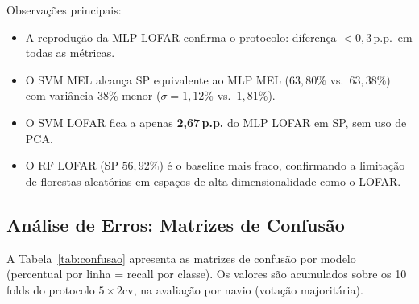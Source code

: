 \documentclass[a4paper,12pt]{article}
\begin{document}
Observações principais:
\begin{itemize}
    \item A reprodução da MLP LOFAR confirma o protocolo: diferença $< 0{,}3$\,p.p.\ em todas as métricas.
    \item O SVM MEL alcança SP equivalente ao MLP MEL ($63{,}80\%$ vs.\ $63{,}38\%$) com variância 38\% menor ($\sigma = 1{,}12\%$ vs.\ $1{,}81\%$).
    \item O SVM LOFAR fica a apenas \textbf{2,67\,p.p.} do MLP LOFAR em SP, sem uso de PCA.
    \item O RF LOFAR (SP $56{,}92\%$) é o baseline mais fraco, confirmando a limitação de florestas aleatórias em espaços de alta dimensionalidade como o LOFAR.
\end{itemize}

\subsection{Análise de Erros: Matrizes de Confusão}

A Tabela~\ref{tab:confusao} apresenta as matrizes de confusão por modelo (percentual por linha = recall por classe). Os valores são acumulados sobre os 10 folds do protocolo $5\times2$cv, na avaliação por navio (votação majoritária).
\end{document}
